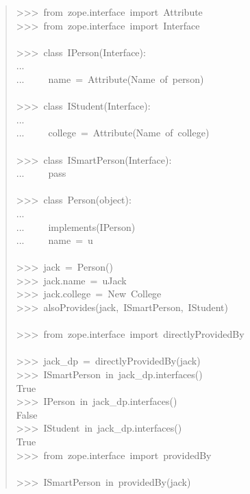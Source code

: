 \documentclass[a4paper,openany,twoside,final]{book}
\begin{document}
\begin{quote}{\ttfamily \raggedright \noindent
>{}>{}>~from~zope.interface~import~Attribute\\
>{}>{}>~from~zope.interface~import~Interface\\
~\\
>{}>{}>~class~IPerson(Interface):\\
...\\
...~~~~~name~=~Attribute(\textquotedbl{}Name~of~person\textquotedbl{})\\
~\\
>{}>{}>~class~IStudent(Interface):\\
...\\
...~~~~~college~=~Attribute(\textquotedbl{}Name~of~college\textquotedbl{})\\
~\\
>{}>{}>~class~ISmartPerson(Interface):\\
...~~~~~pass\\
~\\
>{}>{}>~class~Person(object):\\
...\\
...~~~~~implements(IPerson)\\
...~~~~~name~=~u\textquotedbl{}\textquotedbl{}\\
~\\
>{}>{}>~jack~=~Person()\\
>{}>{}>~jack.name~=~u\textquotedbl{}Jack\textquotedbl{}\\
>{}>{}>~jack.college~=~\textquotedbl{}New~College\textquotedbl{}\\
>{}>{}>~alsoProvides(jack,~ISmartPerson,~IStudent)\\
~\\
>{}>{}>~from~zope.interface~import~directlyProvidedBy\\
~\\
>{}>{}>~jack\_dp~=~directlyProvidedBy(jack)\\
>{}>{}>~ISmartPerson~in~jack\_dp.interfaces()\\
True\\
>{}>{}>~IPerson~in~jack\_dp.interfaces()\\
False\\
>{}>{}>~IStudent~in~jack\_dp.interfaces()\\
True\\
>{}>{}>~from~zope.interface~import~providedBy\\
~\\
>{}>{}>~ISmartPerson~in~providedBy(jack)\\
}
\end{quote}
\end{document}
